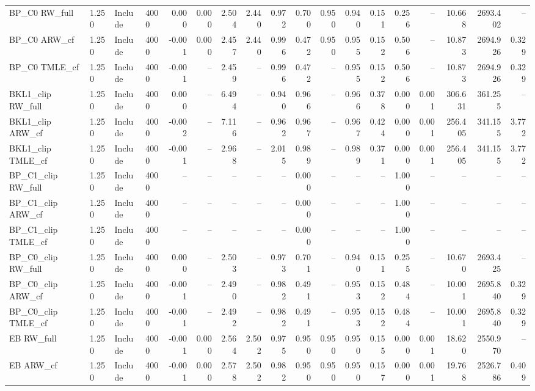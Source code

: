 \begin{tabular}{llllrrrrrrrrrrrrrr}
BP\_C0 RW\_full & 1.250 & Include & 4000 & 0.000 & 0.000 & 2.504 & 2.440 & 0.972 & 0.700 & 0.950 & 0.940 & 0.151 & 0.256 & -- & 10.668 & 2693.402 & -- \\
BP\_C0 ARW\_cf & 1.250 & Include & 4000 & -0.001 & 0.000 & 2.457 & 2.440 & 0.996 & 0.472 & 0.950 & 0.955 & 0.152 & 0.506 & -- & 10.873 & 2694.926 & 0.329 \\
BP\_C0 TMLE\_cf & 1.250 & Include & 4000 & -0.001 & -- & 2.459 & -- & 0.996 & 0.472 & -- & 0.955 & 0.152 & 0.506 & -- & 10.873 & 2694.926 & 0.329 \\
BKL1\_clip RW\_full & 1.250 & Include & 4000 & 0.000 & -- & 6.494 & -- & 0.940 & 0.966 & -- & 0.966 & 0.378 & 0.000 & 0.001 & 306.631 & 361.255 & -- \\
BKL1\_clip ARW\_cf & 1.250 & Include & 4000 & -0.002 & -- & 7.116 & -- & 0.962 & 0.967 & -- & 0.967 & 0.424 & 0.000 & 0.001 & 256.405 & 341.155 & 3.772 \\
BKL1\_clip TMLE\_cf & 1.250 & Include & 4000 & -0.001 & -- & 2.968 & -- & 2.015 & 0.989 & -- & 0.989 & 0.371 & 0.000 & 0.001 & 256.405 & 341.155 & 3.772 \\
BP\_C1\_clip RW\_full & 1.250 & Include & 4000 & -- & -- & -- & -- & -- & 0.000 & -- & -- & -- & 1.000 & -- & -- & -- & -- \\
BP\_C1\_clip ARW\_cf & 1.250 & Include & 4000 & -- & -- & -- & -- & -- & 0.000 & -- & -- & -- & 1.000 & -- & -- & -- & -- \\
BP\_C1\_clip TMLE\_cf & 1.250 & Include & 4000 & -- & -- & -- & -- & -- & 0.000 & -- & -- & -- & 1.000 & -- & -- & -- & -- \\
BP\_C0\_clip RW\_full & 1.250 & Include & 4000 & 0.000 & -- & 2.503 & -- & 0.973 & 0.701 & -- & 0.940 & 0.151 & 0.255 & -- & 10.670 & 2693.425 & -- \\
BP\_C0\_clip ARW\_cf & 1.250 & Include & 4000 & -0.001 & -- & 2.490 & -- & 0.982 & 0.491 & -- & 0.953 & 0.152 & 0.484 & -- & 10.001 & 2695.840 & 0.329 \\
BP\_C0\_clip TMLE\_cf & 1.250 & Include & 4000 & -0.001 & -- & 2.492 & -- & 0.982 & 0.491 & -- & 0.953 & 0.152 & 0.484 & -- & 10.001 & 2695.840 & 0.329 \\
EB RW\_full & 1.250 & Include & 4000 & -0.001 & 0.000 & 2.564 & 2.502 & 0.975 & 0.950 & 0.950 & 0.950 & 0.155 & 0.000 & 0.001 & 18.620 & 2550.970 & -- \\
EB ARW\_cf & 1.250 & Include & 4000 & -0.001 & 0.000 & 2.578 & 2.502 & 0.982 & 0.950 & 0.950 & 0.950 & 0.157 & 0.000 & 0.001 & 19.768 & 2526.786 & 0.409 \\

\end{tabular}
